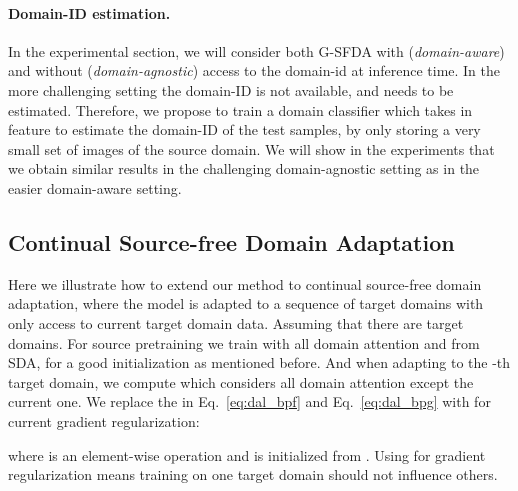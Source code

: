 \documentclass[10pt,twocolumn,letterpaper]{article}
\begin{document}
\vspace{-2mm}
\paragraph{Domain-ID estimation.} In the experimental section, we will consider both G-SFDA with (\emph{domain-aware}) and without (\emph{domain-agnostic}) access to the domain-id at inference time. In the more challenging setting the domain-ID is not available, and needs to be estimated. 
Therefore, we propose to train a domain classifier which takes in feature  to estimate the domain-ID of the test samples, by only storing a very small set of images of the source domain.  
We will show in the experiments that we obtain similar results in the challenging domain-agnostic setting as in the easier domain-aware setting.

\subsection{Continual Source-free Domain Adaptation}
Here we illustrate how to extend our method to continual source-free domain adaptation, where the model is adapted to a sequence of target domains with only access to current target domain data.
Assuming that there are  target domains. For source pretraining we train with all domain attention  and  from SDA, for a good initialization as mentioned before. And when adapting to the -th target domain, we compute  which considers all domain attention except the current one. We replace the  in Eq.~\ref{eq:dal_bpf} and Eq.~\ref{eq:dal_bpg} with  for current gradient regularization:

where  is an element-wise operation and  is initialized from . Using  for gradient regularization means training on one target domain should not influence others.
\end{document}
